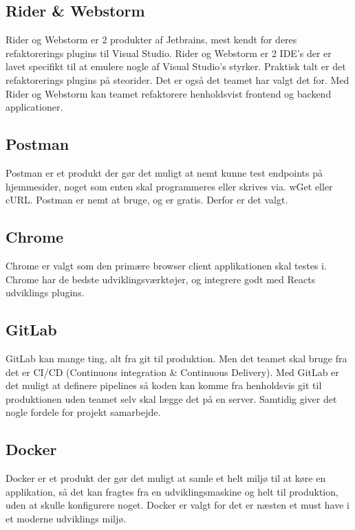 \subsection{Rider \& Webstorm}

Rider og Webstorm er 2 produkter af Jetbrains, mest kendt for deres refaktorerings plugins til Visual Studio. Rider og Webstorm er 2 IDE's der er lavet specifikt til at emulere nogle af Visual Studio's styrker. Praktisk talt er det refaktorerings plugins på steorider. Det er også det teamet har valgt det for. Med Rider og Webstorm kan teamet refaktorere henholdsvist frontend og backend applicationer.

\subsection{Postman}

Postman er et produkt der gør det muligt at nemt kunne test endpoints på hjemmesider, noget som enten skal programmeres eller skrives via. wGet eller cURL. Postman er nemt at bruge, og er gratis. Derfor er det valgt.

\subsection{Chrome}

Chrome er valgt som den primære browser client applikationen skal testes i. Chrome har de bedste udviklingsværktøjer, og integrere godt med Reacts udviklings plugins.

\subsection{GitLab}

GitLab kan mange ting, alt fra git til produktion. Men det teamet skal bruge fra det er CI/CD (Continuous integration \& Continuous Delivery). Med GitLab er det muligt at definere pipelines så koden kan komme fra henholdsvis git til produktionen uden teamet selv skal lægge det på en server. Samtidig giver det nogle fordele for projekt samarbejde.

\subsection{Docker}

Docker er et produkt der gør det muligt at samle et helt miljø til at køre en applikation, så det kan fragtes fra en udviklingsmaskine og helt til produktion, uden at skulle konfigurere noget. Docker er valgt for det er næsten et must have i et moderne udviklings miljø.

